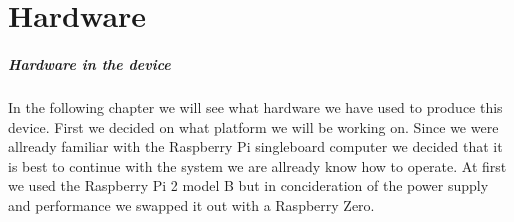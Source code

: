 \chapter{Hardware}\label{ch:hardware}

\paragraph{Hardware in the device} 

In the following chapter we will see what hardware we have used to produce this device.
First we decided on what platform we will be working on.
Since we were allready familiar with the Raspberry Pi singleboard computer we decided that it is best to continue with the system we are allready know how to operate.
At first we used the Raspberry Pi 2 model B but in concideration of the power supply and performance we swapped it out with a Raspberry Zero.



